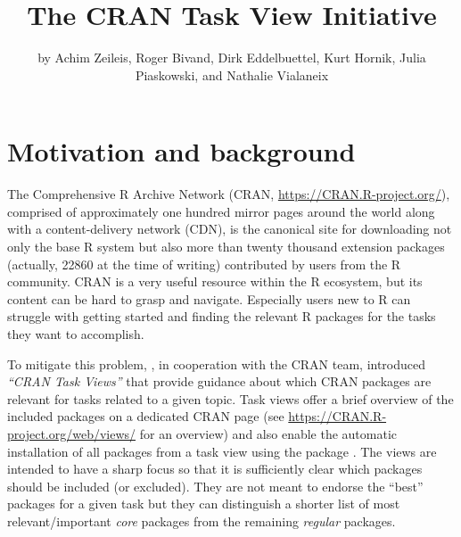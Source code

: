 \title{The CRAN Task View Initiative}


\author{by Achim Zeileis, Roger Bivand, Dirk Eddelbuettel, Kurt Hornik, Julia Piaskowski, and Nathalie Vialaneix}

\maketitle


\section{Motivation and background}\label{motivation-and-background}

The Comprehensive R Archive Network (CRAN, \url{https://CRAN.R-project.org/}), comprised
of approximately one hundred mirror pages around the world along with a content-delivery network (CDN), is the canonical site
for downloading not only the base R system \citep{r-base} but also more than twenty thousand extension packages
(actually, 22860 at the time of writing) contributed by users from
the R community. CRAN is a very useful resource within the R
ecosystem, but its content can be hard to grasp and navigate. Especially users new to R
can struggle with getting started and finding the relevant R packages for the
tasks they want to accomplish.

To mitigate this problem, \citet{ctv-intro}, in cooperation with the CRAN team, introduced
\emph{``CRAN Task Views''} that provide guidance about which CRAN packages
are relevant for tasks related to a given topic. Task views offer a brief overview of
the included packages on a dedicated CRAN page (see
\url{https://CRAN.R-project.org/web/views/} for an overview) and also enable the
automatic installation of all packages from a task view using the
 package \citep{ctv-pkg}. The views are intended to have a sharp focus so
that it is sufficiently clear which packages should be included (or excluded).
They are not meant to endorse the ``best'' packages for a given task but they can
distinguish a shorter list of most relevant/important \emph{core} packages from the
remaining \emph{regular} packages.

